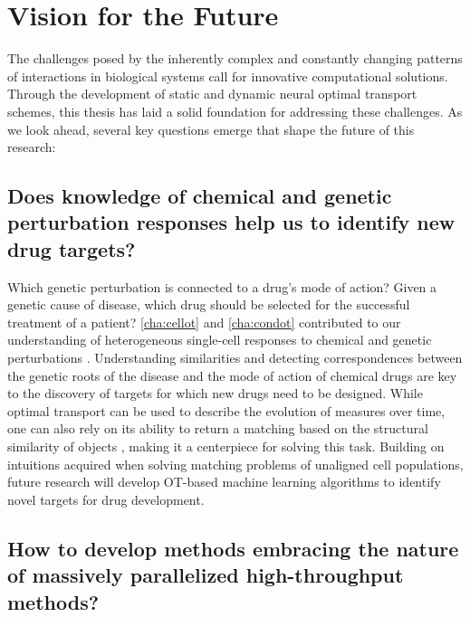 \section*{Vision for the Future}

The challenges posed by the inherently complex and constantly changing patterns of interactions in biological systems call for innovative computational solutions. Through the development of static and dynamic neural optimal transport schemes, this thesis has laid a solid foundation for addressing these challenges.
As we look ahead, several key questions emerge that shape the future of this research:

\subsection*{\textbf{Does knowledge of chemical and genetic perturbation responses help us to identify new drug targets?}}

Which genetic perturbation is connected to a drug's mode of action? Given a genetic cause of disease, which drug should be selected for the successful treatment of a patient?
\cref{cha:cellot} and \cref{cha:condot} contributed to our understanding of heterogeneous single-cell responses to chemical and genetic perturbations \citep[]{bunne2019learning, bunne2022supervised}.
Understanding similarities and detecting correspondences between the genetic roots of the disease and the mode of action of chemical drugs are key to the discovery of targets for which new drugs need to be designed.
While optimal transport can be used to describe the evolution of measures over time, one can also rely on its ability to return a matching based on the structural similarity of objects \citep{memoli2011gromov, bunne2019learning}, making it a centerpiece for solving this task.
Building on intuitions acquired when solving matching problems of unaligned cell populations, future research will develop OT-based machine learning algorithms to identify novel targets for drug development.


\subsection*{\textbf{How to develop methods embracing the nature of massively parallelized high-throughput methods?}}

